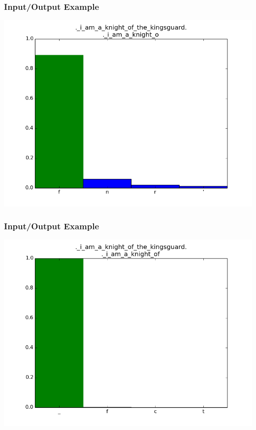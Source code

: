 \documentclass[12]{beamer}
\begin{document}
\begin{frame}
\frametitle{Input/Output Example}
\begin{center}
\includegraphics[scale=0.4]{../distplot/16.png}
\end{center}
\end{frame}

\begin{frame}
\frametitle{Input/Output Example}
\begin{center}
\includegraphics[scale=0.4]{../distplot/17.png}
\end{center}
\end{frame}
\end{document}
